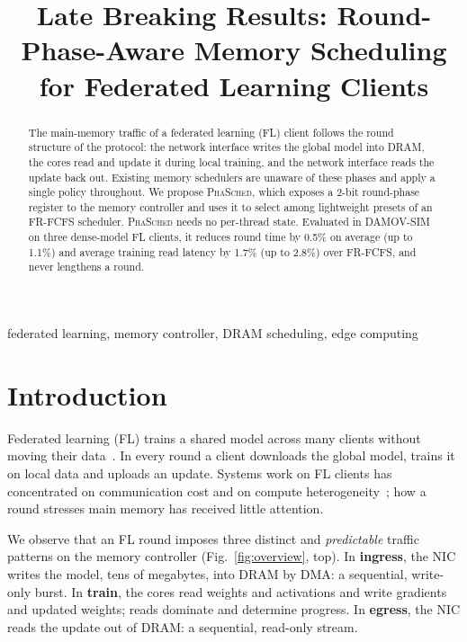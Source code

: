 \documentclass[conference]{IEEEtran}
\newcommand{\name}{\textsc{PhaSched}}
\begin{document}
\title{Late Breaking Results: Round-Phase-Aware Memory Scheduling for Federated Learning Clients}

\author{
}

\maketitle

\begin{abstract}
The main-memory traffic of a federated learning (FL) client follows the round structure of the protocol: the network interface writes the global model into DRAM, the cores read and update it during local training, and the network interface reads the update back out. Existing memory schedulers are unaware of these phases and apply a single policy throughout. We propose \name{}, which exposes a 2-bit round-phase register to the memory controller and uses it to select among lightweight presets of an FR-FCFS scheduler. \name{} needs no per-thread state. Evaluated in DAMOV-SIM on three dense-model FL clients, it reduces round time by 0.5\% on average (up to 1.1\%) and average training read latency by 1.7\% (up to 2.8\%) over FR-FCFS, and never lengthens a round.
\end{abstract}

\begin{IEEEkeywords}
federated learning, memory controller, DRAM scheduling, edge computing
\end{IEEEkeywords}

\section{Introduction}
Federated learning (FL) trains a shared model across many clients without moving their data~\cite{fedavg}. In every round a client downloads the global model, trains it on local data and uploads an update. Systems work on FL clients has concentrated on communication cost and on compute heterogeneity~\cite{flscale,flopen}; how a round stresses main memory has received little attention.

We observe that an FL round imposes three distinct and \emph{predictable} traffic patterns on the memory controller (Fig.~\ref{fig:overview}, top). In \textbf{ingress}, the NIC writes the model, tens of megabytes, into DRAM by DMA: a sequential, write-only burst. In \textbf{train}, the cores read weights and activations and write gradients and updated weights; reads dominate and determine progress. In \textbf{egress}, the NIC reads the update out of DRAM: a sequential, read-only stream.
\end{document}

